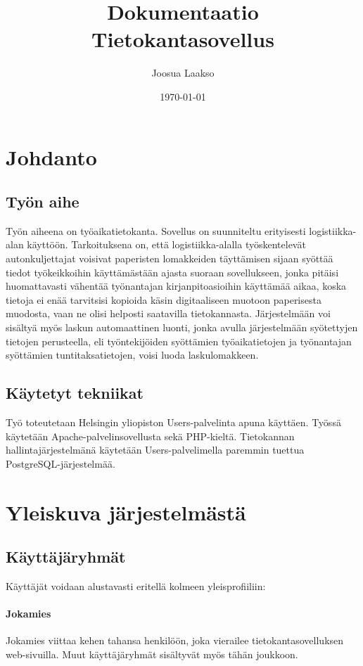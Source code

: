 \documentclass[a4paper, 12pt finnish]{article}
\title{Dokumentaatio \\ \large Tietokantasovellus}
\author{Joosua Laakso}
\date{\today}
\begin{document}
\maketitle

\section{Johdanto} 
\subsection{Työn aihe} Työn aiheena on työaikatietokanta. Sovellus on
suunniteltu erityisesti logistiikka-alan käyttöön. Tarkoituksena on, että
logistiikka-alalla työskentelevät autonkuljettajat voisivat paperisten
lomakkeiden täyttämisen sijaan syöttää tiedot työkeikkoihin käyttämästään
ajasta suoraan sovellukseen, jonka pitäisi huomattavasti vähentää 
työnantajan kirjanpitoasioihin käyttämää aikaa, koska tietoja ei enää
tarvitsisi kopioida käsin digitaaliseen muotoon paperisesta muodosta, vaan
ne olisi helposti saatavilla tietokannasta. Järjestelmään voi sisältyä
myös laskun automaattinen luonti, jonka avulla järjestelmään syötettyjen
tietojen perusteella, eli työntekijöiden syöttämien työaikatietojen ja 
työnantajan syöttämien tuntitaksatietojen, voisi luoda laskulomakkeen.

\subsection{Käytetyt tekniikat} Työ toteutetaan Helsingin yliopiston 
Users-palvelinta apuna käyttäen. Työssä käytetään Apache-palvelinsovellusta
sekä PHP-kieltä. Tietokannan hallintajärjestelmänä käytetään
Users-palvelimella paremmin tuettua PostgreSQL-järjestelmää.

\section{Yleiskuva järjestelmästä}
\subsection{Käyttäjäryhmät} Käyttäjät voidaan alustavasti eritellä kolmeen
yleisprofiiliin:
\paragraph{Jokamies} Jokamies viittaa kehen tahansa henkilöön, joka
vierailee tietokantasovelluksen web-sivuilla. Muut käyttäjäryhmät 
sisältyvät myös tähän joukkoon.
\end{document}

